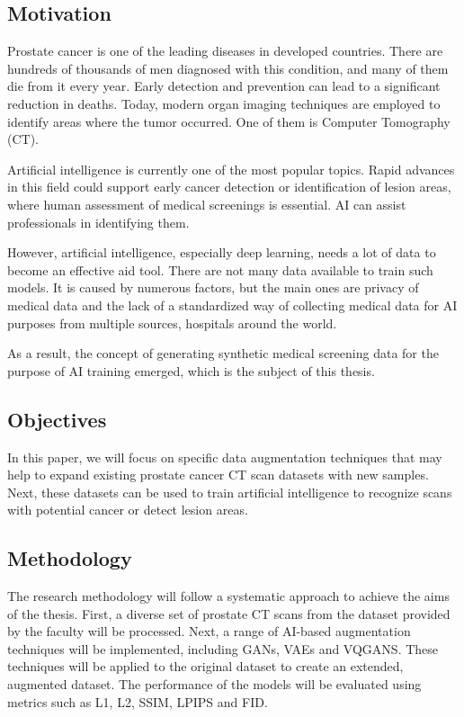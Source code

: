\subsection{Motivation}
Prostate cancer is one of the leading diseases in developed countries. There are hundreds of thousands of men diagnosed with this condition, and many of them die from it every year. Early detection and prevention can lead to a significant reduction in deaths. Today, modern organ imaging techniques are employed to identify areas where the tumor occurred. One of them is Computer Tomography (CT). 

Artificial intelligence is currently one of the most popular topics. Rapid advances in this field could support early cancer detection or identification of lesion areas, where human assessment of medical screenings is essential. AI can assist professionals in identifying them.

However, artificial intelligence, especially deep learning, needs a lot of data to become an effective aid tool. There are not many data available to train such models. It is caused by numerous factors, but the main ones are privacy of medical data and the lack of a standardized way of collecting medical data for AI purposes from multiple sources, hospitals around the world.

As a result, the concept of generating synthetic medical screening data for the purpose of AI training emerged, which is the subject of this thesis. 

\subsection{Objectives}
In this paper, we will focus on specific data augmentation techniques that may help to expand existing prostate cancer CT scan datasets with new samples. Next, these datasets can be used to train artificial intelligence to recognize scans with potential cancer or detect lesion areas. 
\subsection{Methodology}
The research methodology will follow a systematic approach to achieve the aims of the thesis. First, a diverse set of prostate CT scans from the dataset provided by the faculty will be processed. Next, a range of AI-based augmentation techniques will be implemented, including GANs, VAEs and VQGANS. These techniques will be applied to the original dataset to create an extended, augmented dataset. The performance of the models will be evaluated using metrics such as L1, L2, SSIM, LPIPS and FID.
